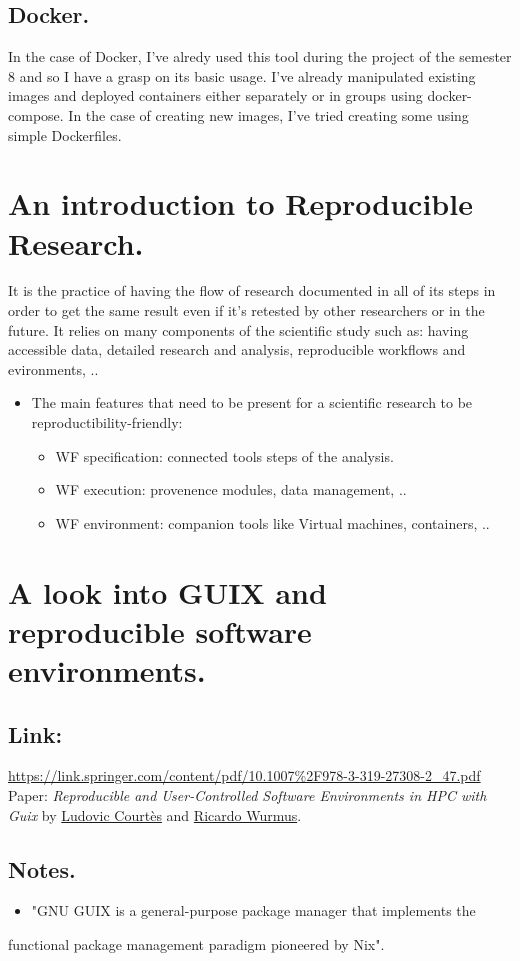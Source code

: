 \documentclass[11pt]{article}
\begin{document}
\subsection{Docker.}
\label{sec:orgc84856c}
In the case of Docker, I've alredy used this tool during the
project of the semester 8 and so I have a grasp on its basic
usage. I've already manipulated existing images and deployed
containers either separately or in groups using docker-compose.
In the case of creating new images, I've tried creating some using
simple Dockerfiles.


\section{An introduction to Reproducible Research.}
\label{sec:org4490f56}
It is the practice of having the flow of research documented in all
of its steps in order to get the same result even if it's retested
by other researchers or in the future. It relies on many components
of the scientific study such as: having accessible data, detailed
research and analysis, reproducible workflows and evironments, ..
\begin{itemize}
\item The main features that need to be present for a scientific
research to be reproductibility-friendly:
\begin{itemize}
\item WF specification: connected tools steps of the analysis.
\item WF execution: provenence modules, data management, ..
\item WF environment: companion tools like Virtual machines, containers, ..
\end{itemize}
\end{itemize}

\section{A look into GUIX and reproducible software environments.}
\label{sec:org0afe8a1}
\subsection{Link:}
\label{sec:org98fa5a5}
  \url{https://link.springer.com/content/pdf/10.1007\%2F978-3-319-27308-2\_47.pdf}
  Paper: \emph{Reproducible and User-Controlled Software Environments in HPC
with Guix} by \uline{Ludovic Courtès} and \uline{Ricardo Wurmus}.

\subsection{Notes.}
\label{sec:org09f5943}
\begin{itemize}
\item "GNU GUIX is a general-purpose package manager that implements the
\end{itemize}
functional package management paradigm pioneered by Nix".
\end{document}
